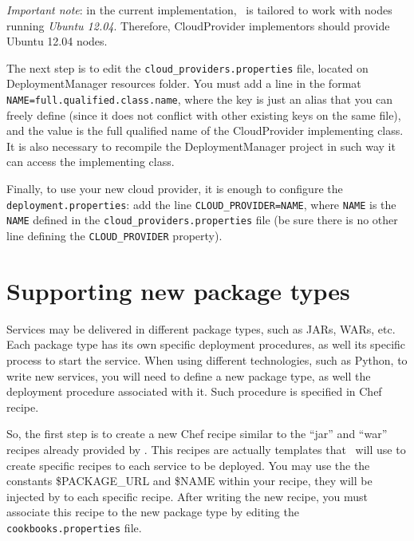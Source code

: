 \emph{Important note}: in the current implementation, \ee\ is tailored to work with nodes running \emph{Ubuntu 12.04}. Therefore, \textsf{CloudProvider} implementors should provide Ubuntu 12.04 nodes. 

The next step is to edit the \texttt{cloud\_providers.properties} file, located on DeploymentManager resources folder. You must add a line in the format \verb!NAME=full.qualified.class.name!, where the key is just an alias that you can freely define (since it does not conflict with other existing keys on the same file), and the value is the full qualified name of the \textsf{CloudProvider} implementing class. It is also necessary to recompile the DeploymentManager project in such way it can access the implementing class.

Finally, to use your new cloud provider, it is enough to configure the \texttt{deployment.properties}: add the line \verb!CLOUD_PROVIDER=NAME!, where \verb!NAME! is the \verb!NAME! defined in the \texttt{cloud\_providers.properties} file (be sure there is no other line defining the \verb!CLOUD_PROVIDER! property).

\section{Supporting new package types}

Services may be delivered in different package types, such as JARs, WARs, etc.
Each package type has its own specific deployment procedures, as well its specific process to start the service.
When using different technologies, such as Python, to write new services, you will need to define a new package type,
as well the deployment procedure associated with it. Such procedure is specified in Chef recipe. 

So, the first step is to create a new Chef recipe similar to the ``jar'' and ``war'' recipes already provided by \ee.
This recipes are actually templates that \ee\ will use to create specific recipes to each service to be deployed.
You may use the the constants \$PACKAGE\_URL and \$NAME within your recipe, they will be injected by \ee to each specific recipe.
After writing the new recipe, you must associate this recipe to the new package type by editing the \texttt{cookbooks.properties} file.


%
%
%
%


